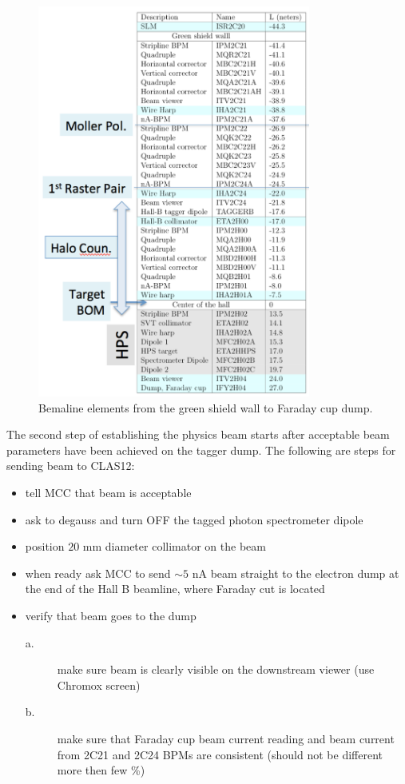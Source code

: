 \begin{figure}[htb!]
\centering
\includegraphics[width=0.8\textwidth]{beamline_elements.pdf}
\caption{Bemaline elements from the green shield wall to Faraday cup dump.}
\label{fig:belements}
\end{figure}

The second step of establishing the physics beam starts after acceptable beam parameters have been achieved on the tagger dump. The following are steps for sending beam to CLAS12:
\begin{itemize}
\item tell MCC that beam is acceptable 
\item ask to degauss and turn OFF the tagged photon spectrometer dipole 
\item position $20$ mm diameter collimator on the beam 
\item when ready ask MCC to send $\sim 5$ nA beam straight to the electron dump at the end of the Hall B beamline, where Faraday cut is located 
\item verify that beam goes to the dump 
\begin{description}
\item[a.] make sure beam is clearly visible on the downstream viewer (use Chromox screen)
\item[b.] make sure that Faraday cup beam current reading and beam current from 2C21 and 2C24 BPMs are consistent (should not be different more then few \%)
\end{description}
\end{itemize}

